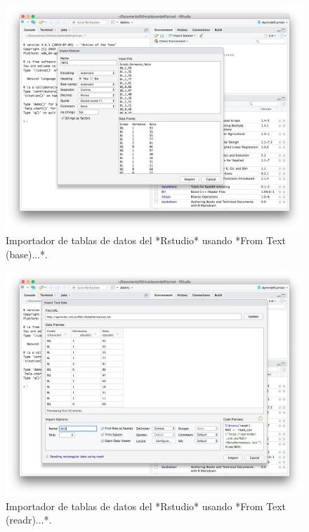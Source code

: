 \documentclass[]{book}
\theoremstyle{definition}
\theoremstyle{definition}
\theoremstyle{definition}
\theoremstyle{remark}
\begin{document}
\begin{figure}

{\centering \includegraphics{AprendeR-Parte-I_files/figure-html/figID1} 

}

\caption{Importador de tablas de datos del *Rstudio* usando *From Text (base)...*.}\label{fig:ID1}
\end{figure}

\begin{figure}

{\centering \includegraphics{AprendeR-Parte-I_files/figure-html/figID2} 

}

\caption{Importador de tablas de datos del *Rstudio* usando *From Text (readr)...*.}\label{fig:ID2}
\end{figure}
\end{document}
